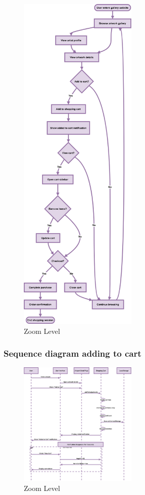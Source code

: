 \documentclass[]{project_final}
\begin{document}
\begin{figure}[ht!]
  \centering
  \includegraphics[width=0.5\textwidth]{AGUserPurchaseFlow.png}
  \vspace*{0.0cm}
  \caption{Zoom Level}
  \label{fig:1}
\end{figure}
\newpage
\subsubsection{Sequence diagram adding to cart}

\begin{figure}[ht!]
  \centering
  \includegraphics[width=0.5\textwidth]{AGSequenceAddingArtToCart.png}
  \vspace*{0.0cm}
  \caption{Zoom Level}
  \label{fig:1}
\end{figure}
\newpage
\end{document}
